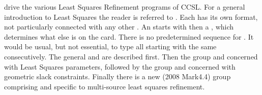 %
 drive the various Least Squares Refinement programs of CCSL.
For a general introduction to Least Squares the reader
is referred to .
\p 
Each  has its own format, not particularly connected with any
other .
\p 
An  starts with  then a \cwcomma, which determines what 
else is
on the card.  There is no predetermined sequence for . It
would be usual, but not essential, to type all  starting with
the same \cw consecutively.
\p 
\cddf
\ms
The general \cws {} and 
 are described first.  Then  the group  and  concerned with Least Squares parameters,
followed by the group  and
 concerned with geometric slack constraints. Finally there is
a new (2008 Mark4.4) group comprising  and  specific to
multi-source least squares refinement.
\p 
{}
\p
